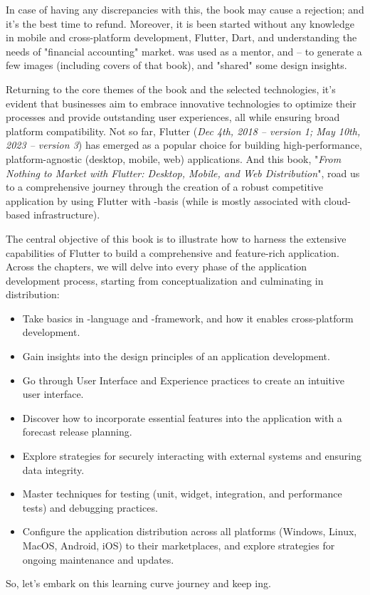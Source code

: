 \noindent In case of having any discrepancies with this, the book may cause a rejection; and it's the best time to 
refund. Moreover, it is been started without any knowledge in mobile and cross-platform development, Flutter, Dart, and 
understanding the needs of "financial accounting" market.  was used as a mentor, and  --
to generate a few images (including covers of that book), and "shared" some design insights.

Returning to the core themes of the book and the selected technologies, it's evident that businesses aim to embrace 
innovative technologies to optimize their processes and provide outstanding user experiences, all while ensuring 
broad platform compatibility. Not so far, Flutter (\emph{Dec 4th, 2018 -- version 1; May 10th, 2023 -- version 3}) 
has emerged as a popular choice for building high-performance, platform-agnostic (desktop, mobile, web) applications. 
And this book, "\emph{From Nothing to Market with Flutter: Desktop, Mobile, and Web Distribution}", road us to a 
comprehensive journey through the creation of a robust competitive application by using Flutter with 
-basis (while  is mostly associated with cloud-based infrastructure).

The central objective of this book is to illustrate how to harness the extensive capabilities of Flutter to build a 
comprehensive and feature-rich application. Across the chapters, we will delve into every phase of the application 
development process, starting from conceptualization and culminating in distribution:

\begin{itemize}
    \item Take basics in -language and -framework, and how it enables cross-platform development.

    \item Gain insights into the design principles of an application development. 
    
    \item Go through User Interface and Experience practices to create an intuitive user interface.

    \item Discover how to incorporate essential features into the application with a forecast release planning.

    \item Explore strategies for securely interacting with external systems and ensuring data integrity.

    \item Master techniques for testing (unit, widget, integration, and performance tests) and debugging practices. 

    \item Configure the application distribution across all platforms (Windows, Linux, MacOS, Android, iOS) to their 
    marketplaces, and explore strategies for ongoing maintenance and updates.
\end{itemize}

\noindent So, let's embark on this learning curve journey and keep ing.